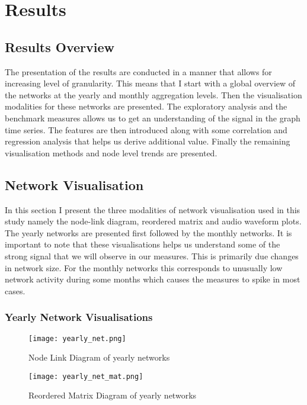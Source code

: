 \chapter{Results}

\section{Results Overview}
The presentation of the results are conducted in a manner that allows for increasing level of granularity. This means that I start with a global overview of the networks at the yearly and monthly aggregation levels. Then the visualisation modalities for these networks are presented. The exploratory analysis and the benchmark measures allows us to get an understanding of the signal in the graph time series. The features are then introduced along with some correlation and regression analysis that helps us derive additional value. Finally the remaining visualisation methods and node level trends are presented. \\

\section{Network Visualisation}

In this section I present the three modalities of network visualisation used in this study namely the node-link diagram, reordered matrix and audio waveform plots. The yearly networks are presented first followed by the monthly networks. It is important to note that these visualisations helps us understand some of the strong signal that we will observe in our measures. This is primarily due changes in network size. For the monthly networks this corresponds to unusually low network activity during some months which causes the measures to spike in most cases. \\

\clearpage{}
\subsection{Yearly Network Visualisations}
\begin{figure}[H]
    \centering
    \texttt{[image: yearly\_net.png]}
    \caption{Node Link Diagram of yearly networks}
    \label{fig:Node Link Diagram for the yearly networks}
\end{figure}

\begin{figure}[H]
    \centering
    \texttt{[image: yearly\_net\_mat.png]}
    \caption{Reordered Matrix Diagram of yearly networks}
    \label{fig:Reordered Matrix Diagram for the yearly networks}
\end{figure}


